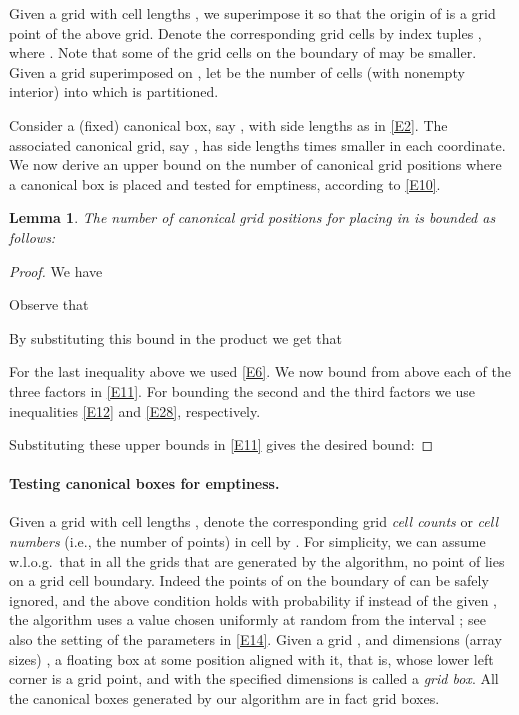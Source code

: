 \documentclass[11pt]{article}
\newtheorem{lemma}{Lemma}
\begin{document}
Given a grid with cell lengths , we superimpose it so that the
origin of  is a grid point of the above grid. Denote the
corresponding grid cells by index tuples , 
where . 
Note that some of the grid cells on the boundary of  may be
smaller. Given a grid  superimposed on , let  be the
number of cells (with nonempty interior) into which  is partitioned. 

Consider a (fixed) canonical box, say ,  with side lengths as in
\eqref{E2}. The associated canonical grid, say , has side lengths
 times smaller in each coordinate. 
We now derive an upper bound on the number of canonical
grid positions where a canonical box is placed and tested for emptiness,
according to \eqref{E10}. 

\begin{lemma} \label{L10}
The number of canonical grid positions for placing  in  is
bounded as follows: 

\end{lemma}
\begin{proof}
We have

Observe that

By substituting this bound in the product we get that
 
For the last inequality above we used \eqref{E6}.
We now bound from above each of the three factors in \eqref{E11}.
For bounding the second and the third factors we use inequalities
\eqref{E12} and \eqref{E28}, respectively.



Substituting these upper bounds in \eqref{E11} gives the desired bound:


\vspace{-2\baselineskip}
\end{proof}


\paragraph{Testing canonical boxes for emptiness.}

Given a grid with cell lengths , denote the corresponding 
grid {\em cell counts} or {\em cell numbers}
(i.e., the number of points) in cell
 by .
For simplicity, we can assume w.l.o.g.\ that in all the grids that are
generated by the algorithm, no point of  lies on a grid cell
boundary. Indeed the points of  on the boundary of  can be
safely ignored, and the above condition holds with probability 
if instead of the given , the algorithm uses a value chosen
uniformly at random from the interval ;
see also the setting of the parameters in \eqref{E14}. 
Given a grid , and dimensions (array sizes) , 
a floating box at some position aligned with it, that is,
whose lower left corner is a grid point, and with the specified 
dimensions is called a {\em grid box}. All the canonical boxes
generated by our algorithm are in fact grid boxes. 
\end{document}

